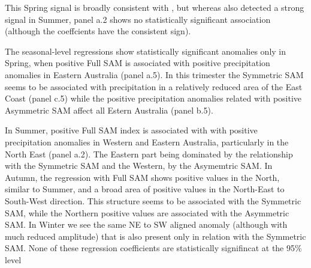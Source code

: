 \documentclass[twocol]{ametsocV5}
\begin{document}
This Spring signal is broadly consistent with \citet{hendon2007}, but
whereas \citet{hendon2007} also detected a strong signal in Summer,
panel a.2 shows no statistically significant association (although the
coeffcients have the consistent sign).

The seasonal-level regressions show statistically significant anomalies
only in Spring, when positive Full SAM is associated with positive
precipitation anomalies in Eastern Australia (panel a.5). In this
trimester the Symmetric SAM seems to be associated with precipitation in
a relatively reduced area of the East Coast (panel c.5) while the
positive precipitation anomalies related with positive Asymmetric SAM
affect all Estern Australia (panel b.5).

In Summer, positive Full SAM index is associated with with positive
precipitation anomalies in Western and Eastern Australia, particularly
in the North East (panel a.2). The Eastern part being dominated by the
relationship with the Symmetric SAM and the Western, by the Asymemtric
SAM. In Autumn, the regression with Full SAM shows positive values in
the North, similar to Summer, and a broad area of positive values in the
North-East to South-West direction. This structure seems to be
associated with the Symmetric SAM, while the Northern positive values
are associated with the Asymmetric SAM. In Winter we see the same NE to
SW aligned anomaly (although with much reduced amplitude) that is also
present only in relation with the Symmetric SAM. None of these
regression coefficients are statistically signifincat at the 95\% level
\end{document}

